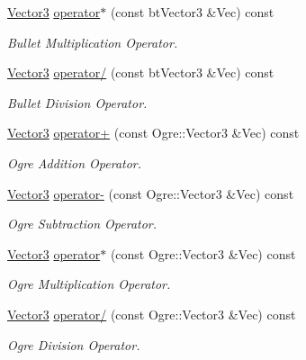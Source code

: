 \begin{DoxyCompactItemize}
\hyperlink{classphys_1_1Vector3}{Vector3} \hyperlink{classphys_1_1Vector3_ac9b49852c6bd2fa2b81f4972d7761697}{operator$\ast$} (const btVector3 \&Vec) const 
\begin{DoxyCompactList}\small\item\em Bullet Multiplication Operator. \item\end{DoxyCompactList}\item 
\hyperlink{classphys_1_1Vector3}{Vector3} \hyperlink{classphys_1_1Vector3_a998a6b51433f43ac8b9434279137a1dd}{operator/} (const btVector3 \&Vec) const 
\begin{DoxyCompactList}\small\item\em Bullet Division Operator. \item\end{DoxyCompactList}\item 
\hyperlink{classphys_1_1Vector3}{Vector3} \hyperlink{classphys_1_1Vector3_a9d08649625ad4d5a7e8665c1234168b9}{operator+} (const Ogre::Vector3 \&Vec) const 
\begin{DoxyCompactList}\small\item\em Ogre Addition Operator. \item\end{DoxyCompactList}\item 
\hyperlink{classphys_1_1Vector3}{Vector3} \hyperlink{classphys_1_1Vector3_a1110bc38c3cb60f97c3946d13917401b}{operator-\/} (const Ogre::Vector3 \&Vec) const 
\begin{DoxyCompactList}\small\item\em Ogre Subtraction Operator. \item\end{DoxyCompactList}\item 
\hyperlink{classphys_1_1Vector3}{Vector3} \hyperlink{classphys_1_1Vector3_ae28e8373fb05d55edbde46eda64c431a}{operator$\ast$} (const Ogre::Vector3 \&Vec) const 
\begin{DoxyCompactList}\small\item\em Ogre Multiplication Operator. \item\end{DoxyCompactList}\item 
\hyperlink{classphys_1_1Vector3}{Vector3} \hyperlink{classphys_1_1Vector3_afadb345e180a9be607ec33de68c7a71b}{operator/} (const Ogre::Vector3 \&Vec) const 
\begin{DoxyCompactList}\small\item\em Ogre Division Operator. \item\end{DoxyCompactList}\item 

\end{DoxyCompactItemize}
